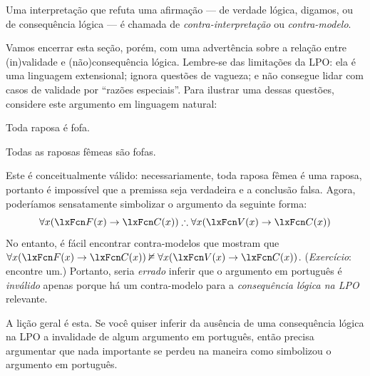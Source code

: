 Uma interpretação que refuta uma afirmação — de verdade lógica, digamos, ou de consequência lógica — é chamada de \emph{contra-interpretação} ou \emph{contra-modelo}.

Vamos encerrar esta seção, porém, com uma advertência sobre a relação entre (in)validade e (não)consequência lógica. Lembre-se das limitações da LPO: ela é uma linguagem extensional; ignora questões de vagueza; e não consegue lidar com casos de validade por \textquotedblleft razões especiais\textquotedblright{}. Para ilustrar uma dessas questões, considere este argumento em linguagem natural:
\begin{earg}
\item[] Toda raposa é fofa.
\item[\texttherefore] Todas as raposas fêmeas são fofas.
\end{earg}
Este é conceitualmente válido: necessariamente, toda raposa fêmea é uma raposa, portanto é impossível que a premissa seja verdadeira e a conclusão falsa. Agora, poderíamos sensatamente simbolizar o argumento da seguinte forma:
$$\forall x(\atom{F}{x} \eif \atom{C}{x}) \therefore \forall x(\atom{V}{x} \eif  \atom{C}{x})$$
No entanto, é fácil encontrar contra-modelos que mostram que $\forall x(\atom{F}{x} \eif \atom{C}{x}) \nentails \forall x(\atom{V}{x} \eif  \atom{C}{x})$. (\emph{Exercício}: encontre um.) Portanto, seria \emph{errado} inferir que o argumento em português é \emph{inválido} apenas porque há um contra-modelo para a \emph{consequência lógica na LPO} relevante.

A lição geral é esta. Se você quiser inferir da ausência de uma consequência lógica na LPO a invalidade de algum argumento em português, então precisa argumentar que nada importante se perdeu na maneira como simbolizou o argumento em português.

\practiceproblems

